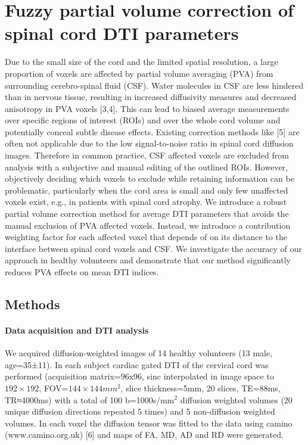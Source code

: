 \section{Fuzzy partial volume correction of spinal cord DTI parameters} 
Due to the small size of the cord and the limited spatial resolution, a large proportion of voxels are affected by partial volume averaging (PVA) from surrounding cerebro-spinal fluid (CSF). Water molecules in CSF are less hindered than in nervous tissue, resulting in increased diffusivity measures and decreased anisotropy in PVA voxels [3,4]. This can lead to biased average measurements over specific regions of interest (ROIs) and over the whole cord volume and potentially conceal subtle disease effects. Existing correction methods like [5] are often not applicable due to the low signal-to-noise ratio in spinal cord diffusion images. Therefore in common practice, CSF affected voxels are excluded from analysis with a subjective and manual editing of the outlined ROIs. However, objectively deciding which voxels to exclude while retaining information can be problematic, particularly when the cord area is small and only few unaffected voxels exist, e.g., in patients with spinal cord atrophy. We introduce a robust partial volume correction method for average DTI parameters that avoids the manual exclusion of PVA affected voxels. Instead, we introduce a contribution weighting factor for each affected voxel that depends of on its distance to the interface between spinal cord voxels and CSF. We investigate the accuracy of our approach in healthy volunteers and demonstrate that our method significantly reduces PVA effects on mean DTI indices. 
\subsection*{Methods} 
\paragraph{Data acquisition and DTI analysis} We acquired diffusion-weighted images of 14 healthy volunteers (13 male, age=35±11). In each subject cardiac gated DTI of the cervical cord was performed (acquisition matrix=96x96, sinc interpolated in image space to $192\times 192$, FOV=$144\times 144mm^2$, slice thickness=5mm, 20 slices, TE=88ms, TR≈4000ms) with a total of 100 b=1000s/mm$^2$ diffusion weighted volumes (20 unique diffusion directions repeated 5 times) and 5 non-diffusion weighted volumes. In each voxel the diffusion tensor was fitted to the data using camino (www.camino.org.uk) [6] and maps of FA, MD, AD and RD were generated. 
